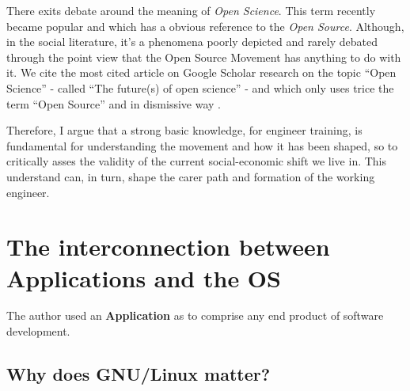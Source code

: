 \documentclass[
12pt,				%
openright,			%
oneside,			%
a4paper,			%
brazil,				%
english,			%
]{abntex2}
\begin{document}
There exits debate around the meaning of \textit{Open Science}. This
term recently became popular and which has a obvious reference to the
\textit{Open Source}. Although, in the social literature, it's a phenomena
poorly depicted and rarely debated through the point view that the Open
Source Movement has anything to do with it. We cite the most cited
article on Google Scholar research on the topic ``Open Science'' -
called ``The future(s) of open science'' - and which only uses trice
the term ``Open Source'' and in dismissive way
\cite{mirowski2018future}.

Therefore, I argue that a strong basic
knowledge, for engineer training, is fundamental for understanding the
movement and how it has been shaped, so to critically asses the
validity of the current social-economic shift we live in. This
understand can, in turn, shape the carer path and formation of the
working engineer.

\section{The interconnection between Applications and the OS}

The author used an \textbf{Application} as to comprise any end product of software development.

\subsection{Why does GNU/Linux matter?}
\end{document}
